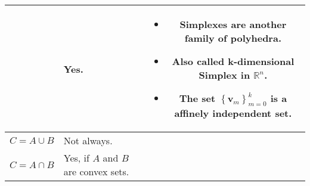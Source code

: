 \documentclass{article}
\newcommand{\trans}{\mathsf{T}}
\newcommand\norm[1]{\left\lVert#1\right\rVert}
\begin{document}
\begin{table}
\begin{tabularx}{\textwidth}{|A|B|C|}
\begin{itemize}[leftmargin=*]
\end{itemize} & Yes. &
\begin{itemize}[leftmargin=*]
    \item Simplexes are another family of polyhedra.
    \item Also called k-dimensional Simplex in \(\mathbb{R}^{n}\).
    \item The set \(\left\{ \mathbf{v}_m \right\}_{m=0}^{k}\) is a affinely independent set.
\end{itemize}\\
\hline
$C = A \cup B $ & Not always. &  \\
\hline
$C = A \cap B $ & Yes, if $A$ and $B$ are convex sets. & \\
\hline
\end{tabularx}
\end{table}
\end{document}
